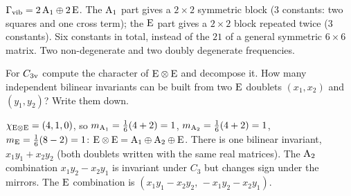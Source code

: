 \begin{solution}
$\Gamma_{\mathrm{vib}}=2\,\mathrm{A}_1\oplus2\,\mathrm{E}$. The $\mathrm{A}_1$ part gives a $2\times2$ symmetric block
($3$ constants: two squares and one cross term); the $\mathrm{E}$ part gives a $2\times2$ block
repeated twice ($3$ constants). Six constants in total, instead of the $21$ of a general
symmetric $6\times6$ matrix. Two non-degenerate and two doubly degenerate frequencies.
\end{solution}

\begin{exercise}\label{ex:3:prod}
For $C_{3\mathrm{v}}$ compute the character of $\mathrm{E}\otimes\mathrm{E}$ and decompose it. How
many independent bilinear invariants can be built from two $\mathrm{E}$ doublets
$(x_1,x_2)$ and $(y_1,y_2)$? Write them down.
\end{exercise}

\begin{solution}
$\chi_{\mathrm{E}\otimes\mathrm{E}}=(4,1,0)$, so
$m_{\mathrm{A}_1}=\tfrac16(4+2)=1$, $m_{\mathrm{A}_2}=\tfrac16(4+2)=1$, $m_{\mathrm{E}}=\tfrac16(8-2)=1$:
$\mathrm{E}\otimes\mathrm{E}=\mathrm{A}_1\oplus\mathrm{A}_2\oplus\mathrm{E}$. There is one bilinear invariant,
$x_1y_1+x_2y_2$ (both doublets written with the same real matrices). The $\mathrm{A}_2$
combination $x_1y_2-x_2y_1$ is invariant under $C_3$ but changes sign under the mirrors.
The $\mathrm{E}$ combination is $(x_1y_1-x_2y_2,\,-x_1y_2-x_2y_1)$.
\end{solution}
